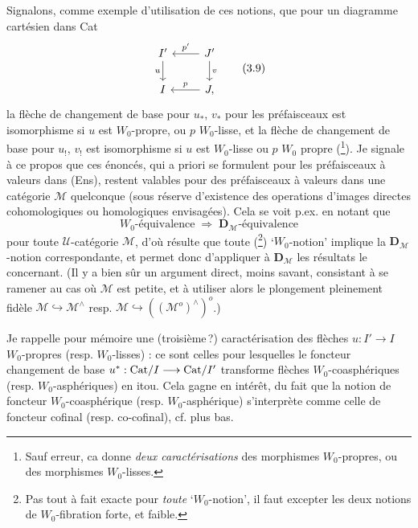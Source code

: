 Signalons, comme exemple d'utilisation de ces notions, que pour un diagramme cartésien dans Cat
\[
\begin{tikzcd}
I' \arrow[d, "u"'] & J' \arrow[l, "p'"'] \arrow[d, "v"] \\
I & J, \arrow[l, "p"']
\end{tikzcd} \tag*{(3.9)}
\]
la flèche de changement de base pour $u_*$, $v_*$ pour les préfaisceaux est isomorphisme si $u$ est $W_0$-propre, ou $p$ $W_0$-lisse, et la flèche de changement de base pour $u_!$, $v_!$ est isomorphisme si $u$ est $W_0$-lisse ou $p$ $W_0$ propre (\footnote[51]{Sauf erreur, ca donne \textit{deux caractérisations} des morphismes $W_0$-propres, ou des morphismes $W_0$-lisses.}). Je signale à ce propos que ces énoncés, qui a priori se formulent pour les préfaisceaux à valeurs dans (Ens), restent valables %
pour des préfaisceaux à valeurs dans une catégorie $\mathcal{M}$ quelconque (sous réserve d'existence des operations d'images directes cohomologiques ou homologiques envisagées). Cela se voit p.ex. en notant que %
\[
\text{$W_0$-équivalence} \;\Longrightarrow\; \text{$\mathbf{D}_{\mathcal{M}}$-équivalence} \tag*{(3.10)}
\]
pour toute $\mathcal{U}$-catégorie $\mathcal{M}$, d'où résulte que toute (\footnote[52]{Pas tout à fait exacte pour \textit{toute} ‘$W_0$-notion’, il faut excepter les deux notions de $W_0$-fibration forte, et faible.}) ‘$W_0$-notion’ implique la $\mathbf{D}_{\mathcal{M}}$-notion correspondante, et permet donc d'appliquer à $\mathbf{D}_{\mathcal{M}}$ les résultats le concernant. (Il y a bien sûr un argument direct, moins savant, consistant à se ramener au cas où $\mathcal{M}$ est petite, et à utiliser alors le plongement pleinement fidèle $\mathcal{M} \hookrightarrow \mathcal{M}^{\wedge}$ resp. $\mathcal{M} \hookrightarrow ((\mathcal{M}^o)^{\wedge})^o$.)

Je rappelle pour mémoire une (troisième\,?) caractérisation des flèches $u : I' \longrightarrow I$ $W_0$-propres (resp. $W_0$-lisses) : ce sont celles pour lesquelles le foncteur changement de base $u^* : \mathrm{Cat}/I \longrightarrow \mathrm{Cat}/I'$ transforme flèches $W_0$-coasphériques (resp. $W_0$-asphériques) en itou. Cela gagne en intérêt, du fait que la notion de foncteur $W_0$-coasphérique (resp. $W_0$-asphérique) s'interprète comme celle de foncteur cofinal (resp. co-cofinal), cf. plus bas.


